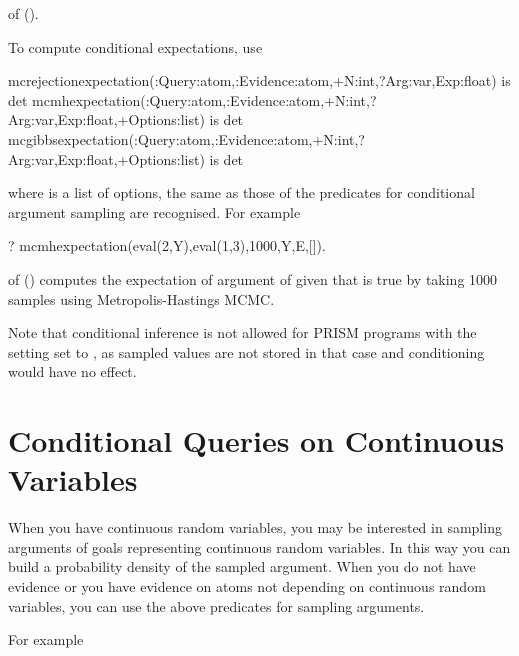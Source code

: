 \documentclass[letterpaper,10pt,english]{sphinxmanual}
\begin{document}
of ().

To compute conditional expectations, use

\begin{sphinxVerbatim}[commandchars=\\\{\}]
mc\PYGZus{}rejection\PYGZus{}expectation(:Query:atom,:Evidence:atom,+N:int,?Arg:var,\PYGZhy{}Exp:float) is det
mc\PYGZus{}mh\PYGZus{}expectation(:Query:atom,:Evidence:atom,+N:int,?Arg:var,\PYGZhy{}Exp:float,+Options:list) is det
mc\PYGZus{}gibbs\PYGZus{}expectation(:Query:atom,:Evidence:atom,+N:int,?Arg:var,\PYGZhy{}Exp:float,+Options:list) is det
\end{sphinxVerbatim}

where  is a list of options, the same as those of the predicates for conditional argument sampling are recognised. For example

\begin{sphinxVerbatim}[commandchars=\\\{\}]
?\PYGZhy{} mc\PYGZus{}mh\PYGZus{}expectation(eval(2,Y),eval(1,3),1000,Y,E,[]).
\end{sphinxVerbatim}

of () computes the expectation of argument  of  given that  is true by taking 1000 samples using Metropolis-Hastings MCMC.

Note that conditional inference is not allowed for PRISM programs with the setting  set to , as sampled values are not stored in that case and conditioning would have no effect.


\section{Conditional Queries on Continuous Variables}
\label{\detokenize{index:conditional-queries-on-continuous-variables}}
When you have continuous random variables, you may be interested in sampling arguments of goals representing continuous random variables.
In this way you can build a probability density of the sampled argument.
When you do not have evidence or you have evidence on atoms not depending on continuous random variables, you can use the above predicates for sampling arguments.

For example
\end{document}
